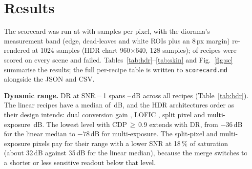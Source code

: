 \documentclass[letterpaper,twocolumn,fleqn]{article}
\begin{document}
\section{Results}
The scorecard was run at \scRes{} with \scSpp{} samples per pixel, with the diorama's measurement band (edge, dead-leaves and white ROIs plus an 8\,px margin) re-rendered at 1024 samples (HDR chart 960$\times$640, 128 samples); \nScored{} of \nRecipes{} recipes were scored on every scene and \nFailed{} failed. Tables~\ref{tab:hdr}--\ref{tab:skin} and Fig.~\ref{fig:sc} summarise the results; the full per-recipe table is written to \texttt{scorecard.md} alongside the JSON and CSV.

\begin{table}[t]
\caption{HDR chart by pixel architecture: number of recipes, range of DR at SNR\,=\,1 and medians of DR at SNR\,=\,10, SNR at 18\,\% of saturation and the lowest level (dB re.\ saturation) with CDP\,$\geq$\,0.9.}
\label{tab:hdr}
\vspace{14pt}
\centering\small

\end{table}

\textbf{Dynamic range.} DR at SNR\,=\,1 spans \drOneMin--\drOneMax\,dB across all recipes (Table~\ref{tab:hdr}). The linear recipes have a median of \drMedLinear\,dB, and the HDR architectures order as their design intends: dual conversion gain \drMedDcg, LOFIC \drMedLofic, split pixel \drMedSplitpixel{} and multi-exposure \drMedMultiexposure\,dB. The lowest level with CDP\,$\geq$\,0.9 extends with DR, from $-36$\,dB for the linear median to $-78$\,dB for multi-exposure. The split-pixel and multi-exposure pixels pay for their range with a lower SNR at 18\,\% of saturation (about 32\,dB against 35\,dB for the linear median), because the merge switches to a shorter or less sensitive readout below that level.

\begin{table}[t]
\caption{Diorama and flare metrics by optical configuration (medians over the recipes sharing it). MTF50 in cycles/pixel; acutance for a 100\,\% monitor view.}
\label{tab:optics}
\vspace{14pt}
\centering\small

\end{table}
\end{document}
